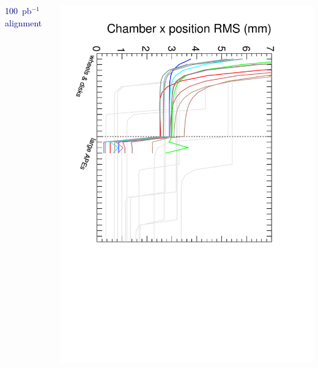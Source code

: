 \documentclass[compress]{beamer}
\begin{document}
\begin{frame}
\begin{columns}
\begin{center} \textcolor{darkblue}{100~pb$^{-1}$ alignment} \end{center}

\vspace{-0.25 cm}
\includegraphics[height=\linewidth, angle=90]{large_APEs-100.pdf}
\end{columns}
\end{frame}
\end{document}
